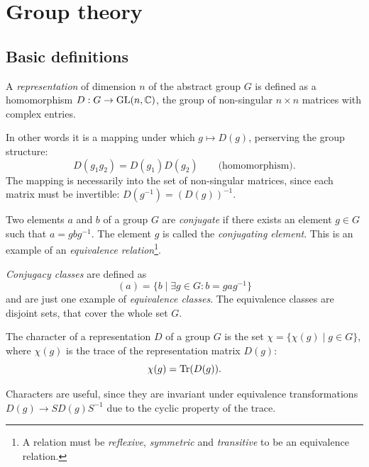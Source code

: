 \documentclass[../../main.tex]{subfiles}
\begin{document}
\section{Group theory}
\label{sec:group_theory}

\subsection{Basic definitions}
\label{subsec:gt_basic_definitions}

\begin{definition}
    A \emph{representation} of dimension $n$ of the abstract group $G$ is defined as a homomorphism $D: G \rightarrow \textnormal{GL}(n, \mathbb{C})$, the group of non-singular $n \times n$ matrices with complex entries. 

    In other words it is a mapping under which $g \mapsto D(g)$, perserving the group structure:
    \begin{equation}
        D(g_1 g_2) = D(g_1) D(g_2) \qquad \text{(homomorphism)}.
    \end{equation}
    The mapping is necessarily into the set of non-singular matrices, since each matrix must be invertible: $D(g^{-1}) = (D(g))^{-1}$.
\end{definition}

\begin{definition}
    Two elements $a$ and $b$ of a group $G$ are \emph{conjugate} if there exists an element $g \in G$ such that $a=gbg^{-1}$. The element $g$ is called the \emph{conjugating element}. This is an example of an \emph{equivalence relation}\footnote{A relation must be \emph{reflexive}, \emph{symmetric} and \emph{transitive} to be an equivalence relation.}.

    \emph{Conjugacy classes} are defined as
    \begin{equation}
        (a) = \{b \mid \exists g \in G: b=gag^{-1} \}
    \end{equation}
    and are just one example of \emph{equivalence classes}. The equivalence classes are disjoint sets, that cover the whole set $G$.
\end{definition}

\begin{definition}
    The character of a representation $D$ of a group $G$ is the set $\chi = \{\chi(g) \mid g \in G\}$, where $\chi(g)$ is the trace of the representation matrix $D(g)$:
    \begin{equation}
        \chi(g) = \textnormal{Tr}(D(g)). 
    \end{equation}
\end{definition}
Characters are useful, since they are invariant under equivalence transformations $D(g) \rightarrow S D(g) S^{-1}$ due to the cyclic property of the trace.
\end{document}

